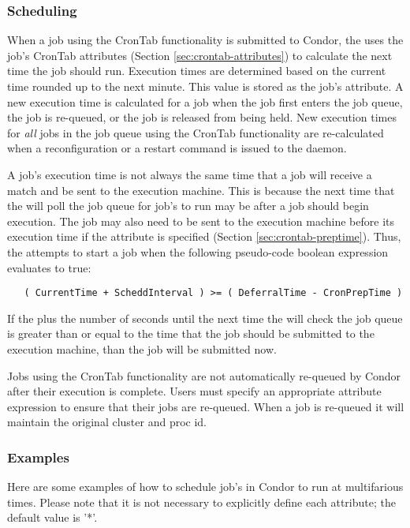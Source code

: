 \subsubsection{Scheduling}
\label{sec:crontab-scheduling}
When a job using the CronTab functionality is submitted to Condor, the  uses the job's CronTab attributes (Section \ref{sec:crontab-attributes}) to calculate the next time the job should run. Execution times are determined based on the current time rounded up to the next minute. This value is stored as the job's  attribute. A new execution time is calculated for a job when the job first enters the job queue, the job is re-queued, or the job is released from being held. New execution times for \emph{all} jobs in the job queue using the CronTab functionality are re-calculated when a reconfiguration or a restart command is issued to the
 daemon.

A job's execution time is not always the same time that a job will receive a match and be sent to the execution machine. This is because the next time that the  will poll the job queue for job's to run may be after a job should begin execution. The job may also need to be  sent to the execution machine before its execution time if the  attribute is
specified (Section \ref{sec:crontab-preptime}). Thus, the  attempts to start a job when the following pseudo-code boolean expression evaluates to true:

\begin{verbatim}
   ( CurrentTime + ScheddInterval ) >= ( DeferralTime - CronPrepTime )
\end{verbatim}

If the  plus the number of seconds until the next time the  will check the job queue is greater than or equal to the time that the job should be submitted to the execution machine, than the job will be submitted now.

Jobs using the CronTab functionality are not automatically re-queued by Condor after their execution is complete. Users must specify an appropriate  attribute expression to ensure that their jobs are re-queued. When a job is re-queued it will maintain the original cluster and proc id.

\subsubsection{Examples}
\label{sec:crontab-examples}
Here are some examples of how to schedule job's in Condor to
run at multifarious times. Please note that it is not necessary to 
explicitly define each attribute; the default value is '*'.


